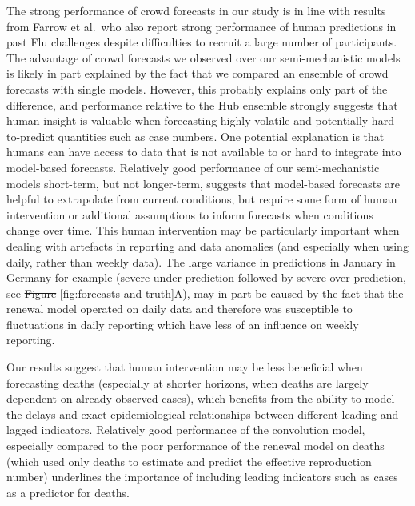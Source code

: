 \documentclass[10pt,letterpaper]{article}
\providecommand{\DIFaddtex}[1]{{\protect\color{blue}\uwave{#1}}} %
\providecommand{\DIFdeltex}[1]{{\protect\color{red}\sout{#1}}}                      %
\providecommand{\DIFaddbegin}{} %
\providecommand{\DIFaddend}{} %
\providecommand{\DIFdelbegin}{} %
\providecommand{\DIFdelend}{} %
\providecommand{\DIFadd}[1]{\texorpdfstring{\DIFaddtex{#1}}{#1}} %
\providecommand{\DIFdel}[1]{\texorpdfstring{\DIFdeltex{#1}}{}} %
\newcommand{\DIFscaledelfig}{0.5}
\newlength{\DIFdelgraphicswidth} %
\newlength{\DIFdelgraphicsheight} %
\newcommand{\DIFaddincludegraphics}[2][]{{\color{blue}\fbox{\DIFOincludegraphics[#1]{#2}}}} %
\newcommand{\DIFdelincludegraphics}[2][]{%
\sbox{\DIFdelgraphicsbox}{\DIFOincludegraphics[#1]{#2}}%
\settoboxwidth{\DIFdelgraphicswidth}{\DIFdelgraphicsbox} %
\settoboxtotalheight{\DIFdelgraphicsheight}{\DIFdelgraphicsbox} %
\scalebox{\DIFscaledelfig}{%
\parbox[b]{\DIFdelgraphicswidth}{\usebox{\DIFdelgraphicsbox}\\[-\baselineskip] \rule{\DIFdelgraphicswidth}{0em}}\llap{\resizebox{\DIFdelgraphicswidth}{\DIFdelgraphicsheight}{%
\setlength{\unitlength}{\DIFdelgraphicswidth}%
\begin{picture}(1,1)%
\thicklines\linethickness{2pt} %
{\color[rgb]{1,0,0}\put(0,0){\framebox(1,1){}}}%
{\color[rgb]{1,0,0}\put(0,0){\line( 1,1){1}}}%
{\color[rgb]{1,0,0}\put(0,1){\line(1,-1){1}}}%
\end{picture}%
}\hspace*{3pt}}} %
} %
\DeclareRobustCommand{\DIFaddbegin}{\DIFOaddbegin \let\includegraphics\DIFaddincludegraphics} %
\DeclareRobustCommand{\DIFaddend}{\DIFOaddend \let\includegraphics\DIFOincludegraphics} %
\DeclareRobustCommand{\DIFdelbegin}{\DIFOdelbegin \let\includegraphics\DIFdelincludegraphics} %
\DeclareRobustCommand{\DIFdelend}{\DIFOaddend \let\includegraphics\DIFOincludegraphics} %
\begin{document}
The strong performance of crowd forecasts in our study is in line with
results from Farrow et al.~who also report strong performance of human
predictions in past Flu challenges despite difficulties to recruit a
large number of participants. The advantage of crowd forecasts we
observed over our semi-mechanistic models is likely in part explained by
the fact that we compared an ensemble of crowd forecasts with single
models. However, this probably explains only part of the difference, and
performance relative to the Hub ensemble strongly suggests that human
insight is valuable when forecasting highly volatile and potentially
hard-to-predict quantities such as case numbers. One potential
explanation is that humans can have access to data that is not available
to or hard to integrate into model-based forecasts. Relatively good
performance of our semi-mechanistic models short-term, but not
longer-term, suggests that model-based forecasts are helpful to
extrapolate from current conditions, but require some form of human
intervention or additional assumptions to inform forecasts when
conditions change over time. This human intervention may be particularly
important when dealing with artefacts in reporting and data anomalies
(and especially when using daily, rather than weekly data). The large
variance in predictions in January in Germany for example (severe
under-prediction followed by severe over-prediction, see \DIFdelbegin \DIFdel{Figure
}\DIFdelend \DIFaddbegin \DIFadd{Fig
}\DIFaddend \ref{fig:forecasts-and-truth}A), may in part be caused by the fact that
the renewal model operated on daily data and therefore was susceptible
to fluctuations in daily reporting which have less of an influence on
weekly reporting.

Our results suggest that human intervention may be less beneficial when
forecasting deaths (especially at shorter horizons, when deaths are
largely dependent on already observed cases), which benefits from the
ability to model the delays and exact epidemiological relationships
between different leading and lagged indicators. Relatively good
performance of the convolution model, especially compared to the poor
performance of the renewal model on deaths (which used only deaths to
estimate and predict the effective reproduction number) underlines the
importance of including leading indicators such as cases as a predictor
for deaths.
\end{document}
